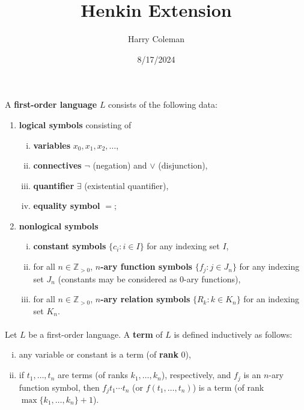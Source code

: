 \documentclass[12pt]{article}
\renewcommand{\maketitle}{\thispagestyle{title}}
\newlength{\myparskip}
\newenvironment{fullbox}{\begin{lrbox}{\savefullbox}\begin{minipage}{\dimexpr\textwidth-2\fboxsep\relax}\setlength{\parskip}{\myparskip}}{\end{minipage}\end{lrbox}\framebox[\textwidth]{\usebox{\savefullbox}}}
\newenvironment{pbox}[1][]{\begin{fullbox}\def\temp{#1}\ifx\temp\empty\else\paragraph{#1}\phantom{}\fi}{\end{fullbox}}
\theoremstyle{definition}
\newcommand{\Z}{\mathbb{Z}}
\newcommand{\<}{\langle}
\renewcommand{\>}{\rangle}
\newcommand{\keyword}{\textbf}
\begin{document}
\title{Henkin Extension}
\author{Harry Coleman}
\date{8/17/2024}
\maketitle

\begin{pbox}
    A \keyword{first-order language} $L$ consists of the following data:
    \begin{enumerate}[(1)]
        \item \keyword{logical symbols} consisting of
            \begin{enumerate}[(i)]
                \item \keyword{variables} $x_0, x_1, x_2, \dots$,
                \item \keyword{connectives} $\lnot$ (negation) and $\lor$ (disjunction),
                \item \keyword{quantifier} $\exists$ (existential quantifier),
                \item \keyword{equality symbol} $=$;
            \end{enumerate}
        \item \keyword{nonlogical symbols}
            \begin{enumerate}[(i)]
                \item \keyword{constant symbols} $\{c_i : i \in I\}$ for any indexing set $I$,
                \item for all $n \in \Z_{>0}$, \keyword{$n$-ary function symbols} $\{f_j : j \in J_n\}$ for any indexing set $J_n$ (constants may be considered as $0$-ary functions),
                \item for all $n \in \Z_{>0}$, \keyword{$n$-ary relation symbols} $\{R_k : k \in K_n\}$ for an indexing set $K_n$.
            \end{enumerate}
    \end{enumerate}
\end{pbox}

\begin{pbox}
    Let $L$ be a first-order language.
    A \keyword{term} of $L$ is defined inductively as follows:
    \begin{enumerate}[(i)]
        \item any variable or constant is a term (of \keyword{rank} $0$),
        \item if $t_1, \dots, t_n$ are terms (of ranks $k_1, \dots, k_n$), respectively, and $f_j$ is an $n$-ary function symbol, then $f_j t_1 \cdots t_n$ (or $f(t_1, \dots, t_n)$) is a term (of rank $\max\{k_1, \dots, k_n\} + 1$).
    \end{enumerate}
\end{pbox}
\end{document}
